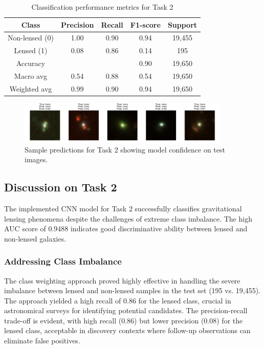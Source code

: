 \documentclass[11pt,a4paper]{article}
\begin{document}
\begin{table}[H]
    \centering
    \caption{Classification performance metrics for Task 2}
    \label{tab:classification_report}
    \begin{tabular}{ccccc}
    \toprule
    \textbf{Class} & \textbf{Precision} & \textbf{Recall} & \textbf{F1-score} & \textbf{Support} \\
    \midrule
    Non-lensed (0) & 1.00 & 0.90 & 0.94 & 19,455 \\
    Lensed (1) & 0.08 & 0.86 & 0.14 & 195 \\
    \midrule
    Accuracy & & & 0.90 & 19,650 \\
    Macro avg & 0.54 & 0.88 & 0.54 & 19,650 \\
    Weighted avg & 0.99 & 0.90 & 0.94 & 19,650 \\
    \bottomrule
    \end{tabular}
\end{table}

\begin{figure}[H]
    \centering
    \includegraphics[width=0.9\textwidth]{../Task2/results/sample_predictions.png}
    \caption{Sample predictions for Task 2 showing model confidence on test images.}
    \label{fig:sample_predictions}
\end{figure}


\subsection{Discussion on Task 2}

The implemented CNN model for Task 2 successfully classifies gravitational lensing phenomena despite the challenges of extreme class imbalance. The high AUC score of 0.9488 indicates good discriminative ability between lensed and non-lensed galaxies.

\subsubsection{Addressing Class Imbalance}
The class weighting approach proved highly effective in handling the severe imbalance between lensed and non-lensed samples in the test set (195 vs. 19,455). The approach yielded a high recall of 0.86 for the lensed class, crucial in astronomical surveys for identifying potential candidates. The precision-recall trade-off is evident, with high recall (0.86) but lower precision (0.08) for the lensed class, acceptable in discovery contexts where follow-up observations can eliminate false positives.
\end{document}
